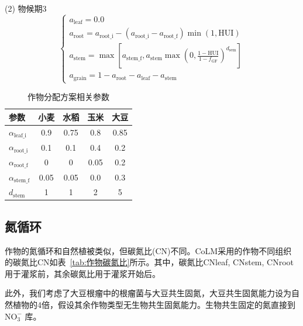 (2)	物候期3 \\
\begin{equation}
  \left\{\begin{array}{c}
    a_{\mathrm{leaf}}=0.0 \\
    a_{\mathrm{root}}=a_{\mathrm{root\_i}}-\left(a_{\mathrm{root\_i}}-a_{\mathrm{root\_f}}\right) \min(1, {\mathrm {HUI}}) \\
    a_{\mathrm{stem}}=\max \left[a_{\mathrm{stem\_f}}, a_{\mathrm{stem}} \max \left(0, \frac{1-{\mathrm {HUI}}}{1-f_{\mathrm{GF}}}\right)^{d_{\mathrm{sem}}}\right] \\
    a_{\mathrm{grain}}=1-a_{\mathrm{root}}-a_{\mathrm{leaf}}-a_{\mathrm{stem}}
  \end{array}\right.
\end{equation}
\begin{table}[htbp]
  \centering
  \caption{作物分配方案相关参数}
  \label{tab:作物分配方案相关参数}
\begin{tabular}{@{}lcccc@{}}
  \toprule
参数       & 小麦   & 水稻   & 玉米   & 大豆   \\ \midrule
$\alpha_{\mathrm{leaf\_i}}$ & 0.9  & 0.75 & 0.8  & 0.85 \\
$\alpha_{\mathrm{root\_i}}$ & 0.1  & 0.1  & 0.4  & 0.2  \\
$\alpha_{\mathrm{root\_f}}$ & 0    & 0    & 0.05 & 0.2  \\
$\alpha_{\mathrm{stem\_f}}$ & 0.05 & 0.05 & 0.0  & 0.3  \\
$d_{\mathrm{stem}}$    & 1    & 1    & 2    & 5   \\\bottomrule
\end{tabular}
\end{table}

\subsection{氮循环}
作物的氮循环和自然植被类似，但碳氮比(CN)不同。CoLM采用的作物不同组织的碳氮比CN如表~\ref{tab:作物碳氮比}所示。其中，碳氮比CNleaf, CNstem, CNroot用于灌浆前，其余碳氮比用于灌浆开始后。

此外，我们考虑了大豆根瘤中的根瘤菌与大豆共生固氮，大豆共生固氮能力设为自然植物的4倍，假设其余作物类型无生物共生固氮能力。生物共生固定的氮直接到 $\mathrm{NO_3^-}$ 库。

